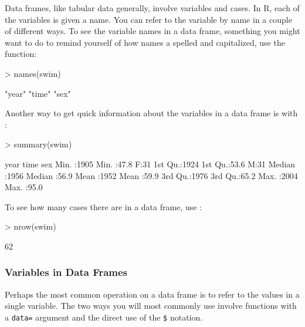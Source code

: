 Data frames, like tabular data generally, involve variables and
cases.  In R, each of the variables is given a name.  You can refer to
the variable by name in a couple of different ways.  To see the
variable names in a data frame, something you might want to do to
remind yourself of how names a spelled and capitalized, use the
 function:
\begin{Schunk}
\begin{Sinput}
> names(swim)
\end{Sinput}
\begin{Soutput}
[1] "year" "time" "sex" 
\end{Soutput}
\end{Schunk}
Another way to get quick information about the variables in a data
frame is with :
\begin{Schunk}
\begin{Sinput}
> summary(swim)
\end{Sinput}
\begin{Soutput}
      year           time      sex   
 Min.   :1905   Min.   :47.8   F:31  
 1st Qu.:1924   1st Qu.:53.6   M:31  
 Median :1956   Median :56.9         
 Mean   :1952   Mean   :59.9         
 3rd Qu.:1976   3rd Qu.:65.2         
 Max.   :2004   Max.   :95.0         
\end{Soutput}
\end{Schunk}

To see how many cases there are in a data frame, use :
\begin{Schunk}
\begin{Sinput}
> nrow(swim)
\end{Sinput}
\begin{Soutput}
[1] 62
\end{Soutput}
\end{Schunk}

\subsubsection{Variables in Data Frames}

Perhaps the most common operation on a data frame is to refer to the
values in a single variable.  The two ways you will most commonly use
involve functions with a \texttt{data=} argument and the direct use of
the \verb+$+ notation.

